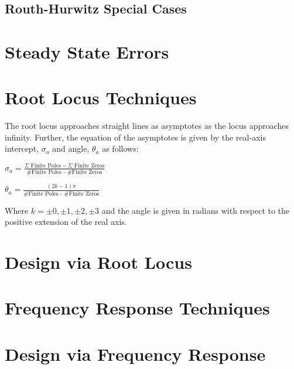 \documentclass[11pt]{article}
\begin{document}
    \subsection{Routh-Hurwitz Special Cases}
    \section{Steady State Errors}
    \section{Root Locus Techniques}
    
    The root locus approaches straight lines as asymptotes as the locus approaches infinity. Further, the equation of the asymptotes is given by the real-axis intercept, $\sigma_a$ and angle, $\theta_a$ as follows:
    \begin{center}
        $\sigma_a = \frac{\Sigma \text{ Finite Poles} - \Sigma \text{ Finite Zeros}}{\text{\# Finite Poles - \# Finite Zeros}}$ 
    \end{center}
    
    \begin{center}
        $\theta_a = \frac{(2k - 1)\pi}{\text{\# Finite Poles - \# Finite Zeros}}$ 
    \end{center}

    Where $k = \pm 0, \pm 1, \pm 2, \pm 3$ and the angle is given in radians with respect to the positive
extension of the real axis.
    \section{Design via Root Locus}
    \section{Frequency Response Techniques}
    \section{Design via Frequency Response}
    
    
\end{document}
